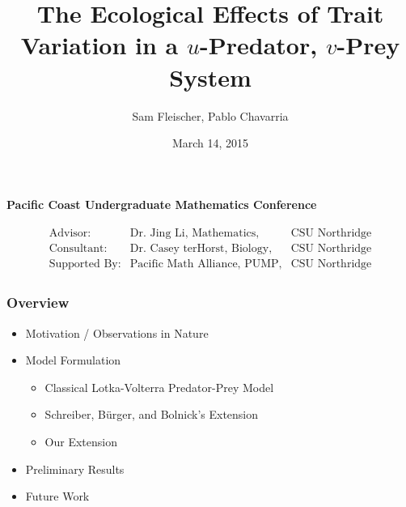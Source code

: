 \documentclass[10pt]{beamer}
\title{The Ecological Effects of Trait Variation in a $u$-Predator, $v$-Prey System}
\author{Sam Fleischer, Pablo Chavarria}
\date{March 14, 2015}
\begin{document}
\begin{frame}
	\titlepage
	\begin{center}
		{\bf Pacific Coast Undergraduate Mathematics Conference}
	\end{center}
	\begin{align*}
		\begin{array}{lll}
		\text{Advisor:} & \text{Dr. Jing Li, Mathematics,} & \text{CSU Northridge} \\
		\text{Consultant:} & \text{Dr. Casey terHorst, Biology,} & \text{CSU Northridge} \\
		\text{Supported By:} & \text{Pacific Math Alliance, PUMP,} & \text{CSU Northridge}
		\end{array}
	\end{align*}
\end{frame}

\begin{frame}
	\frametitle{Overview}
	\begin{itemize}
		\item Motivation / Observations in Nature
		\item Model Formulation
		\begin{itemize}
			\item Classical Lotka-Volterra Predator-Prey Model
			\item Schreiber, B\"urger, and Bolnick's Extension
			\item Our Extension
		\end{itemize}
		\item Preliminary Results
		\item Future Work
	\end{itemize}
\end{frame}
\end{document}
